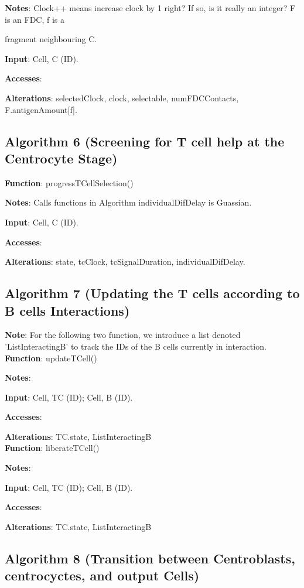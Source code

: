\documentclass[english]{article}
\begin{document}
\textbf{Notes}: Clock++ means increase clock by 1 right? If so, is it really an integer? F is an FDC, f is a 

fragment neighbouring C. 

\textbf{Input}: Cell, C (ID). 

\textbf{Accesses}: 

\textbf{Alterations}: selectedClock, clock, selectable, numFDCContacts,  F.antigenAmount[f]. 

\subsection{Algorithm 6 (Screening for T cell help at the Centrocyte Stage)}
\textbf{Function}: progressTCellSelection()

\textbf{Notes}: Calls functions in Algorithm individualDifDelay is Guassian.

\textbf{Input}: Cell, C (ID). 

\textbf{Accesses}:

\textbf{Alterations}: state, tcClock, tcSignalDuration, individualDifDelay.

\subsection{Algorithm 7 (Updating the T cells according to B cells Interactions)}
\textbf{Note}: For the following two function, we introduce a list denoted 'ListInteractingB' to track the IDs of the B cells currently in interaction.
\\
\textbf{Function}: updateTCell()

\textbf{Notes}:

\textbf{Input}: Cell, TC (ID); Cell, B (ID). 

\textbf{Accesses}:

\textbf{Alterations}: TC.state, ListInteractingB
\\
\textbf{Function}: liberateTCell()

\textbf{Notes}:

\textbf{Input}: Cell, TC (ID); Cell, B (ID). 

\textbf{Accesses}:

\textbf{Alterations}: TC.state, ListInteractingB


\subsection{Algorithm 8 (Transition between Centroblasts, centrocyctes, and output Cells)}	
\end{document}
